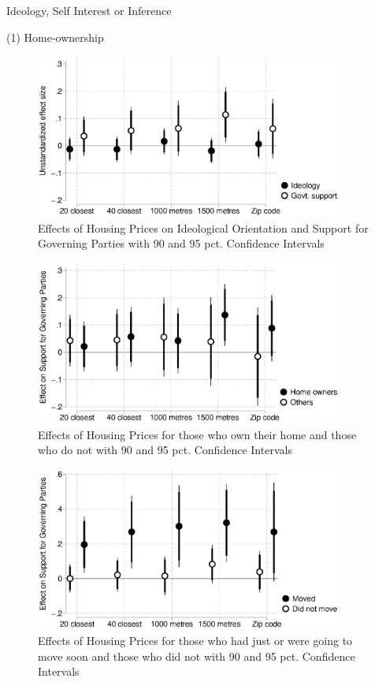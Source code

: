 \documentclass[12pt,a4paper]{article}
\begin{document}
Ideology, Self Interest or Inference

(1) Home-ownership

\begin{figure}[htbp!]
	\includegraphics[width=0.9\textwidth]{../figures/ideology.eps}
	\centering
	\caption{Effects of Housing Prices on Ideological Orientation and Support for Governing Parties with 90  and 95 pct. Confidence Intervals}\label{ideology}
\end{figure}

\begin{figure}[htbp!]
	\includegraphics[width=0.9\textwidth]{../figures/homeown.eps}
	\centering
	\caption{Effects of Housing Prices for those who own their home and those who do not with 90  and 95 pct. Confidence Intervals}\label{homeown}
\end{figure}

\begin{figure}[htbp!]
	\includegraphics[width=0.9\textwidth]{../figures/moving.eps}
	\centering
	\caption{Effects of Housing Prices for those who had just or were going to move soon and those who did not with 90 and 95 pct. Confidence Intervals}\label{move}
\end{figure}
\end{document}
